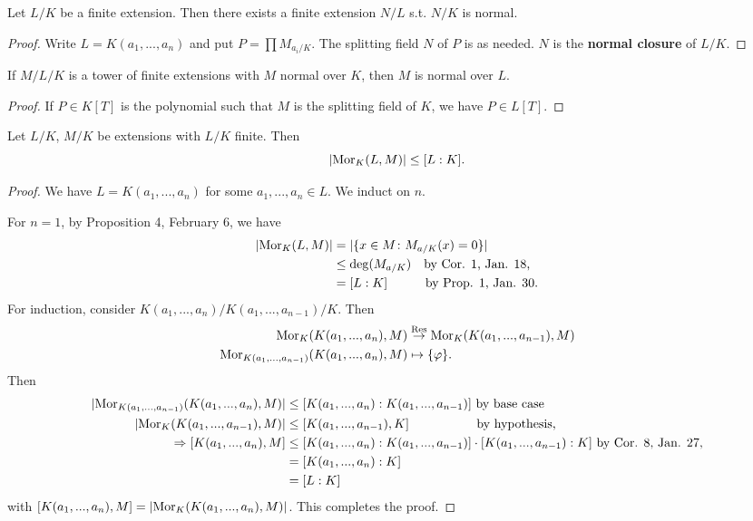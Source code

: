 \begin{fact}
	Let $L/K$ be a finite extension. Then there exists a finite extension $N/L$ s.t. $N/K$ is normal.
\end{fact}

\begin{proof}
	Write $L = K(a_1,..., a_n)$ and put $P = \prod M_{a_i/K}$. The splitting field $N$ of $P$ is as needed. $N$ is the \textbf{normal closure} of $L/K$.
\end{proof}

\begin{fact}
	If $M/L/K$ is a tower of finite extensions with $M$ normal over $K$, then $M$ is normal over $L$.
\end{fact}

\begin{proof}
	If $P \in K[T]$ is the polynomial such that $M$ is the splitting field of $K$, we have $P \in L[T]$.
\end{proof}

\begin{prop}
	Let $L/K$, $M/K$ be extensions with $L/K$ finite. Then
	\[|\text{Mor}_K(L,M)| \leq [L : K].\]
\end{prop}

\begin{proof}
	We have $L = K(a_1, ..., a_n)$ for some $a_1, ..., a_n \in L$. We induct on $n$. 
	
	For $n = 1$, by Proposition 4, February 6, we have
	\begin{align*}
	|\text{Mor}_K(L,M)| &= |\{x \in M \colon M_{a/K}(x) = 0\}| \\
	&\leq \deg(M_{a/K}) \quad \text{by Cor. 1, Jan. 18,} \\
	&= [L : K] \qquad \quad \text{by Prop. 1, Jan. 30.}
	\end{align*}
	For induction, consider $K(a_1, ..., a_n)/K(a_1, ..., a_{n-1})/K$.  Then 
	\begin{align*}
	\text{Mor}_K(K(a_1, ..., a_n), M) &\stackrel{\text{Res}}{\rightarrow} \text{Mor}_K(K(a_1, ..., a_{n-1}), M) \\
	\text{Mor}_{K(a_1, ..., a_{n-1})}(K(a_1, ..., a_n), M) &\mapsto \{\varphi\}.
	\end{align*}
	Then
	\begin{align*}
	|\text{Mor}_{K(a_1, ..., a_{n-1})}(K(a_1, ..., a_n), M)| &\leq [K(a_1, ..., a_n) : K(a_1, ..., a_{n-1})] \text{ by base case} \\
	|\text{Mor}_K(K(a_1, ..., a_{n-1}), M)| &\leq [K(a_1, ..., a_{n-1}), K] \qquad \qquad \quad \text{ by hypothesis,} \\
	\Rightarrow [K(a_1, ..., a_n), M] &\leq [K(a_1, ..., a_n) : K(a_1, ..., a_{n-1})] \cdot [K(a_1, ..., a_{n-1}) : K] \text{ by Cor. 8, Jan. 27,} \\
	&= [K(a_1, ..., a_n) : K] \\
	&= [L : K]
	\end{align*}
	with $[K(a_1, ..., a_n), M] = |\text{Mor}_K(K(a_1, ..., a_n), M)|$. This completes the proof.
\end{proof}

